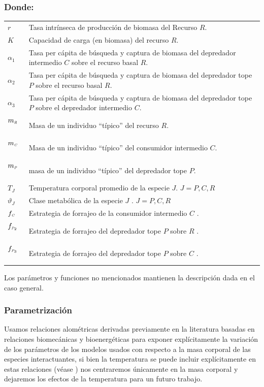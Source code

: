 \subsubsection*{Donde:}
\begin{longtable}{l@{:}p{5.8in}}
$r$  \ & Tasa intr\'inseca de producci\'on de biomasa del Recurso $R$.\\
$K$  \  &Capacidad de carga (en biomasa) del recurso $R$.\\
$\alpha_1$  \ & Tasa per c\'apita de b\'usqueda y captura de biomasa del depredador intermedio $C$ sobre  el recurso basal $R$.\\
$\alpha_2$ \ & Tasa per c\'apita de b\'usqueda y captura de biomasa del depredador tope $P$ sobre  el recurso basal $R$.\\
$\alpha_3$ \  &Tasa per c\'apita de b\'usqueda y captura de biomasa del depredador tope $P$ sobre  el depredador intermedio $C$.\\
$m_{\textit{\tiny R}}$  \ & Masa de un individuo ``t\'ipico'' del recurso $R$.\\
$m_{\textit{\tiny C}}$  \ & Masa de un individuo ``t\'ipico'' del consumidor intermedio $C$.\\
$m_\textit{\tiny P}$  \ & masa de un individuo ``t\'ipico'' del depredador tope $P$.\\
$T_J$ \ & Temperatura corporal promedio de la especie $J$. $J = P,C,R$ \\
$\vartheta_J$ \ & Clase metab\'olica de la especie $J$ . $J = P,C,R$ \\
$f_{\textit{\tiny C}}$ \ & Estrategia de forrajeo de la consumidor intermedio $C$ .\\
$f_{\textit{\tiny P}_2}$ \ & Estrategia de forrajeo del depredador tope $P$ sobre $R$ .\\
$f_{\textit{\tiny P}_3}$ \ & Estrategia de forrajeo del depredador tope $P$ sobre $C$ .\\

\end{longtable}

Los par\'ametros y funciones no mencionados mantienen la descripci\'on dada en el caso general.
\subsubsection{Parametrizaci\'on}
Usamos relaciones alom\'etricas derivadas previamente en la literatura basadas en relaciones biomec\'anicas y bioenerg\'eticas \citep{savage2004predominance,brown2004toward,west1997general,savage2004effects,pawar2012dimensionality,mcgill2006allometric,peters1986ecological,kiltie2000scaling,yodzis1992body} para exponer expl\'icitamente la variaci\'on de los par\'ametros de los modelos usados con respecto a la masa corporal de las especies interactuantes,  si bien la temperatura se puede incluir expl\'icitamente en estas relaciones (v\'ease \citealt{brown2004toward,savage2004effects}) nos centraremos \'unicamente en la masa corporal y dejaremos los efectos de la temperatura para un futuro trabajo.

